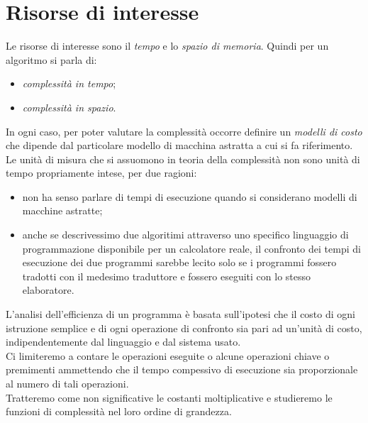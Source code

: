 \documentclass[12pt]{report}
\begin{document}
   	\section{Risorse di interesse}
   	Le risorse di interesse sono il \textit{tempo} e lo \textit{spazio di memoria}. Quindi per un algoritmo si parla di:
   	\begin{itemize}
   		\item \textit{complessità in tempo};
   		\item \textit{complessità in spazio}.
   	\end{itemize}
   	In ogni caso, per poter valutare la complessità occorre definire un \textit{modelli di costo} che dipende dal particolare modello di macchina astratta a cui si fa riferimento. Le unità di misura che si assuomono in teoria della complessità non sono unità di tempo propriamente intese, per due ragioni:
   	\begin{itemize}
   		\item non ha senso parlare di tempi di esecuzione quando si considerano modelli di macchine astratte;
   		\item anche se descrivessimo due algoritimi attraverso uno specifico linguaggio di programmazione disponibile per un calcolatore reale, il confronto dei tempi di esecuzione dei due programmi sarebbe lecito solo se i programmi fossero tradotti con il medesimo traduttore e fossero eseguiti con lo stesso elaboratore.
   	\end{itemize}
   	L'analisi dell'efficienza di un programma è basata sull'ipotesi che il costo di ogni istruzione semplice e di ogni operazione di confronto sia pari ad un'unità di costo, indipendentemente dal linguaggio e dal sistema usato. \\
   	Ci limiteremo a contare le operazioni eseguite o alcune operazioni chiave o premimenti ammettendo che il tempo compessivo di esecuzione sia proporzionale al numero di tali operazioni. \\
   	Tratteremo come non significative le costanti moltiplicative e studieremo le funzioni di complessità nel loro ordine di grandezza.
\end{document}
